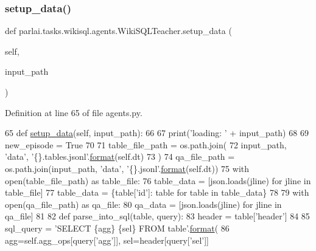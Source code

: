 \subsubsection{\texorpdfstring{setup\+\_\+data()}{setup\_data()}}
{\footnotesize\ttfamily def parlai.\+tasks.\+wikisql.\+agents.\+Wiki\+S\+Q\+L\+Teacher.\+setup\+\_\+data (\begin{DoxyParamCaption}\item[{}]{self,  }\item[{}]{input\+\_\+path }\end{DoxyParamCaption})}



Definition at line 65 of file agents.\+py.


\begin{DoxyCode}
65     \textcolor{keyword}{def }\hyperlink{namespaceparlai_1_1tasks_1_1multinli_1_1agents_a4fa2cb0ba1ed745336ad8bceed36b841}{setup\_data}(self, input\_path):
66 
67         print(\textcolor{stringliteral}{'loading: '} + input\_path)
68 
69         new\_episode = \textcolor{keyword}{True}
70 
71         table\_file\_path = os.path.join(
72             input\_path, \textcolor{stringliteral}{'data'}, \textcolor{stringliteral}{'\{\}.tables.jsonl'}.\hyperlink{namespaceparlai_1_1chat__service_1_1services_1_1messenger_1_1shared__utils_a32e2e2022b824fbaf80c747160b52a76}{format}(self.dt)
73         )
74         qa\_file\_path = os.path.join(input\_path, \textcolor{stringliteral}{'data'}, \textcolor{stringliteral}{'\{\}.jsonl'}.\hyperlink{namespaceparlai_1_1chat__service_1_1services_1_1messenger_1_1shared__utils_a32e2e2022b824fbaf80c747160b52a76}{format}(self.dt))
75         with open(table\_file\_path) \textcolor{keyword}{as} table\_file:
76             table\_data = [json.loads(jline) \textcolor{keywordflow}{for} jline \textcolor{keywordflow}{in} table\_file]
77             table\_data = \{table[\textcolor{stringliteral}{'id'}]: table \textcolor{keywordflow}{for} table \textcolor{keywordflow}{in} table\_data\}
78 
79         with open(qa\_file\_path) \textcolor{keyword}{as} qa\_file:
80             qa\_data = [json.loads(jline) \textcolor{keywordflow}{for} jline \textcolor{keywordflow}{in} qa\_file]
81 
82         \textcolor{keyword}{def }parse\_into\_sql(table, query):
83             header = table[\textcolor{stringliteral}{'header'}]
84 
85             sql\_query = \textcolor{stringliteral}{'SELECT \{agg\} \{sel\} FROM table'}.\hyperlink{namespaceparlai_1_1chat__service_1_1services_1_1messenger_1_1shared__utils_a32e2e2022b824fbaf80c747160b52a76}{format}(
86                 agg=self.agg\_ops[query[\textcolor{stringliteral}{'agg'}]], sel=header[query[\textcolor{stringliteral}{'sel'}]]

\end{DoxyCode}
